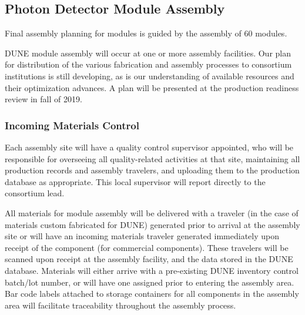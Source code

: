 \subsection{Photon Detector Module Assembly}

Final assembly planning for  modules is guided by the assembly of \num{60}   modules. 

DUNE   module assembly will occur at one or more assembly facilities.  Our plan for distribution of the various fabrication and assembly processes to consortium institutions is still developing, as is our understanding of available resources and their optimization advances.  
A plan will be presented at the production readiness review in fall of 2019.




\subsubsection{Incoming Materials Control}


Each assembly site will have a quality control supervisor appointed, who will be responsible for overseeing all quality-related activities at that site, maintaining all production records and assembly travelers, and uploading them to the production database as appropriate.   This local supervisor will report directly to the  consortium lead.

All materials for  module assembly will be delivered with a  traveler (in the case of materials custom fabricated for DUNE) generated prior to arrival at the assembly site or will have an incoming materials traveler generated immediately upon receipt of the component (for commercial components).  These travelers will be scanned upon receipt at the assembly facility, and the data stored in the DUNE  database.  Materials will either arrive with a pre-existing DUNE inventory control batch/lot number, or will have one assigned prior to entering the assembly area.  Bar code labels attached to storage containers for all components in the assembly area will facilitate traceability throughout the assembly process.

